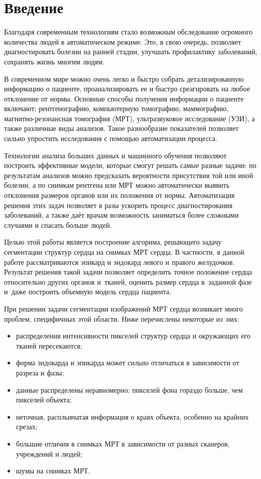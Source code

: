 \section{Введение}

Благодаря современным технологиям стало возможным обследование огромного количества людей в автоматическом режиме. Это, в свою очередь, позволяет диагностировать болезни на ранней стадии, улучшать профилактику заболеваний, сохранять жизнь многим людям.

В современном мире можно очень легко и быстро собрать детализированную информацию о пациенте, проанализировать ее и быстро среагировать на любое отклонение от нормы. Основные способы получения информации о пациенте включают: рентгенографию, компьютерную томографию, маммографию, магнитно-резонансная томография (МРТ), ультразвуковое исследование (УЗИ), а также различные виды анализов. Такое разнообразие показателей позволяет сильно упростить исследования с помощью автоматизации процесса.

Технологии анализа больших данных и машинного обучения позволяют построить эффективные модели, которые смогут решать самые разные задачи: по результатам анализов можно предсказать вероятности присутствия той или иной болезни, а по снимкам рентгена или МРТ можно автоматически выявить отклонения размеров органов или их положения от нормы. Автоматизация решения этих задач позволяет в разы ускорить процесс диагностирования заболеваний, а также даёт врачам возможность заниматься более сложными случаями и спасать больше людей.

Целью этой работы является построение алгорима, решающего задачу сегментации структур сердца на снимках МРТ сердца. В частности, в данной работе рассматриваются эпикард и эндокард левого и правого желудочков. Результат решения такой задачи позволяет определить точное положение сердца относительно других органов и~тканей, оценить размер сердца в~заданной фазе и~даже построить объемную модель сердца пациента.

При решении задачи сегментации изображений МРТ сердца возникает много проблем, специфичных этой области. Ниже перечислены некоторые из~них:

\begin{itemize}
  \item распределения интенсивности пикселей структур сердца и окружающих его тканей пересекаются;
  \item форма эндокарда и эпикарда может сильно отличаться в зависимости от разреза и фазы;
  \item данные распределены неравномерно: пикселей фона гораздо больше, чем пикселей объекта;
  \item неточная, расплывчатая информация о краях объекта, особенно на крайних срезах;
  \item большие отличия в снимках МРТ в зависимости от разных сканеров, учреждений и людей;
  \item шумы на снимках МРТ.
\end{itemize}

